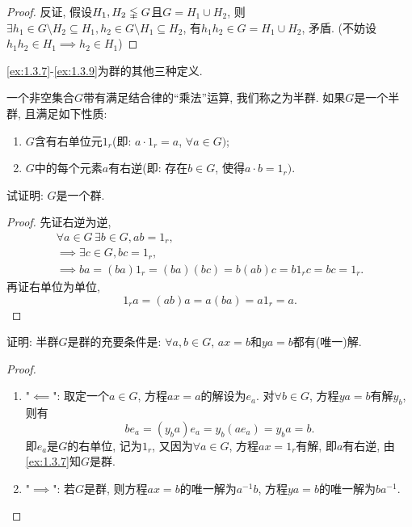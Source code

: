 \begin{proof}
    反证, 假设$H_1, H_2 \lvertneqq G$且$G = H_1 \cup H_2$, 则$\exists h_1 \in G \setminus H_2 \subseteq H_1, h_2 \in G \setminus H_1 \subseteq H_2$, 有$h_1h_2 \in G = H_1 \cup H_2$, 矛盾. (不妨设$h_1h_2 \in H_1 \implies h_2 \in H_1$)
\end{proof}

\ref{ex:1.3.7}-\ref{ex:1.3.9}为群的其他三种定义.

\begin{problem}\label{ex:1.3.7}
    一个非空集合$G$带有满足结合律的“乘法”运算, 我们称之为半群. 如果$G$是一个半群, 且满足如下性质:
    \begin{enumerate}[(1)]
        \item $G$含有右单位元$1_r$(即: $a \cdot 1_r = a$, $\forall a \in G)$;
        \item $G$中的每个元素$a$有右逆(即: 存在$b \in G$, 使得$a \cdot b = 1_r)$.
    \end{enumerate}
    试证明: $G$是一个群.
\end{problem}

\begin{proof}
    先证右逆为逆,
    \[
    \begin{gathered}
        \forall a \in G \, \exists b \in G, ab = 1_r,\\
        \implies \exists c \in G, bc = 1_r,\\
        \implies ba = (ba)1_r = (ba)(bc) = b(ab)c = b1_rc = bc = 1_r.
    \end{gathered}
    \]
    再证右单位为单位,
    \[
        1_ra = (ab)a = a(ba) = a1_r = a.
    \]
\end{proof}

\begin{problem}\label{ex:1.3.8}
    证明: 半群$G$是群的充要条件是: $\forall a, b \in G$, $ax = b$和$ya = b$都有(唯一)解.
\end{problem}

\begin{proof}
\begin{enumerate}[(1)]
    \item "$\impliedby$": 取定一个$a \in G$, 方程$ax = a$的解设为$e_a$. 对$\forall b \in G$, 方程$ya = b$有解$y_b$, 则有
    \[
        be_a = (y_ba)e_a = y_b(ae_a) = y_ba = b.
    \]
    即$e_a$是$G$的右单位, 记为$1_r$, 又因为$\forall a \in G$, 方程$ax = 1_r$有解, 即$a$有右逆, 由\ref{ex:1.3.7}知$G$是群.
    \item "$\implies$": 若$G$是群, 则方程$ax = b$的唯一解为$a^{-1}b$, 方程$ya = b$的唯一解为$ba^{-1}$.
\end{enumerate}
    
\end{proof}

